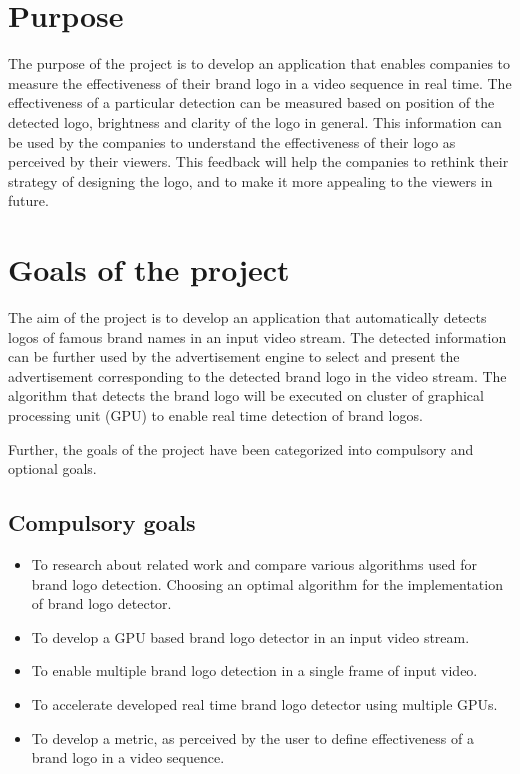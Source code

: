\section{Purpose}
The purpose of the project is to develop an application that enables companies to measure the effectiveness of their brand logo in a video sequence in real time. The effectiveness of a particular detection can be measured based on position of the detected logo, brightness and clarity of the logo in general. This information can be used by the companies to understand the effectiveness of their logo as perceived by their viewers. This feedback will help the companies to rethink their strategy of designing the logo, and to make it more appealing to the viewers in future.

\section{Goals of the project}

The aim of the project is to develop an application that automatically detects logos of famous brand names in an input video stream. The detected information can be further used by the advertisement engine to select and present the advertisement corresponding to the detected brand logo in the video stream. The algorithm that detects the brand logo will be executed on cluster of graphical processing unit (GPU) to enable real time detection of brand logos.

Further, the goals of the project have been categorized into compulsory and optional goals.  

\subsection{Compulsory goals} 
\begin{itemize}
	\item To research about related work and compare various algorithms used for brand logo detection. Choosing an optimal algorithm for the implementation of brand logo detector.
	
	\item To develop a GPU based brand logo detector in an input video stream.
	
	\item To enable multiple brand logo detection in a single frame of input video.
	
	\item To accelerate developed real time brand logo detector using multiple GPUs.
	
	\item To develop a metric, as perceived by the user to define effectiveness of a brand logo in a video sequence.   
\end{itemize} 

